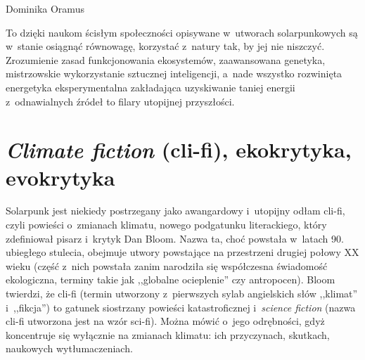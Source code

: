\begin{artplenv}{Dominika Oramus}

To dzięki naukom ścisłym społeczności opisywane w~utworach solarpunkowych są w~stanie osiągnąć równowagę, korzystać z~natury tak, by jej nie niszczyć. Zrozumienie zasad funkcjonowania ekosystemów, zaawansowana genetyka, mistrzowskie wykorzystanie sztucznej inteligencji, a~nade wszystko rozwinięta energetyka eksperymentalna zakładająca uzyskiwanie taniej energii z~odnawialnych źródeł to filary utopijnej przyszłości.

\section*{\textit{Climate fiction} (cli-fi), ekokrytyka, evokrytyka}
Solarpunk jest niekiedy postrzegany jako awangardowy i~utopijny odłam cli-fi, czyli powieści o~zmianach klimatu, nowego podgatunku literackiego, który zdefiniował pisarz i~krytyk Dan Bloom. Nazwa ta, choć powstała w~latach 90. ubiegłego stulecia, obejmuje utwory powstające na przestrzeni drugiej połowy XX wieku (część z~nich powstała zanim narodziła się współczesna świadomość ekologiczna, terminy takie jak ,,globalne ocieplenie'' czy antropocen). Bloom twierdzi, że cli-fi (termin utworzony z~pierwszych sylab angielskich słów ,,klimat'' i~,,fikcja'') to gatunek siostrzany powieści katastroficznej i~\textit{science fiction} (nazwa cli-fi utworzona jest na wzór sci-fi). Można mówić o~jego odrębności, gdyż koncentruje się wyłącznie na zmianach klimatu: ich przyczynach, skutkach, naukowych wytłumaczeniach.


\end{artplenv}
